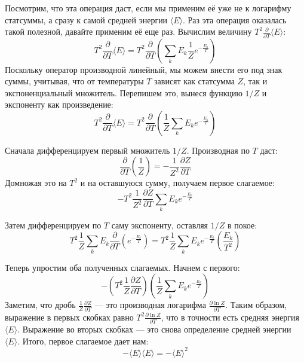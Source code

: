 \documentclass[../general/general]{subfiles}
\begin{document}
Посмотрим, что эта операция даст, если мы применим её уже не к логарифму статсуммы, а сразу к самой средней энергии $\langle E \rangle$. Раз эта операция оказалась такой полезной, давайте применим её еще раз. Вычислим величину $T^2 \frac{\partial}{\partial T} \langle E \rangle$:
\begin{equation*}
    T^2 \frac{\partial}{\partial T} \langle E \rangle = T^2 \frac{\partial}{\partial T} \left( \sum_k E_k \frac{1}{Z} e^{-\frac{E_k}{T}} \right)
\end{equation*}
Поскольку оператор производной линейный, мы можем внести его под знак суммы, учитывая, что от температуры $T$ зависят как статсумма $Z$, так и экспоненциальный множитель. Перепишем это, вынеся функцию $1/Z$ и экспоненту как произведение:
\begin{equation*}
    T^2 \frac{\partial}{\partial T} \langle E \rangle = T^2 \frac{\partial}{\partial T} \left( \frac{1}{Z} \sum_k E_k e^{-\frac{E_k}{T}} \right)
\end{equation*}

Сначала дифференцируем первый множитель $1/Z$. Производная по $T$ даст:
\begin{equation*}
    \frac{\partial}{\partial T} \left( \frac{1}{Z} \right) = -\frac{1}{Z^2} \frac{\partial Z}{\partial T}
\end{equation*}
Домножая это на $T^2$ и на оставшуюся сумму, получаем первое слагаемое:
\begin{equation*}
    -T^2 \frac{1}{Z^2} \frac{\partial Z}{\partial T} \sum_k E_k e^{-\frac{E_k}{T}}
\end{equation*}

Затем дифференцируем по $T$ саму экспоненту, оставляя $1/Z$ в покое:
\begin{equation*}
    T^2 \frac{1}{Z} \sum_k E_k \frac{\partial}{\partial T} \left( e^{-\frac{E_k}{T}} \right) = T^2 \frac{1}{Z} \sum_k E_k e^{-\frac{E_k}{T}} \left( \frac{E_k}{T^2} \right)
\end{equation*}

Теперь упростим оба полученных слагаемых. Начнем с первого:
\begin{equation*}
    - \left( T^2 \frac{1}{Z} \frac{\partial Z}{\partial T} \right) \left( \frac{1}{Z} \sum_k E_k e^{-\frac{E_k}{T}} \right)
\end{equation*}
Заметим, что дробь $\frac{1}{Z} \frac{\partial Z}{\partial T}$ — это производная логарифма $\frac{\partial \ln Z}{\partial T}$. Таким образом, выражение в первых скобках равно $T^2 \frac{\partial \ln Z}{\partial T}$, что в точности есть средняя энергия $\langle E \rangle$. Выражение во вторых скобках — это снова определение средней энергии $\langle E \rangle$. Итого, первое слагаемое дает нам:
\begin{equation*}
    -\langle E \rangle \langle E \rangle = -\langle E \rangle^2
\end{equation*}
\end{document}
